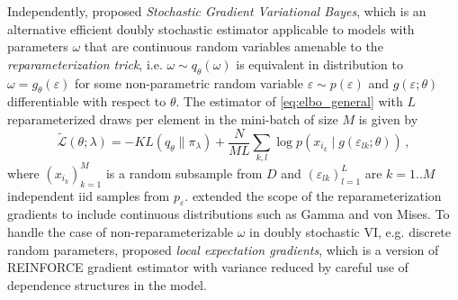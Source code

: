 \documentclass[a4paper,10pt,twocolumn]{article}
\begin{document}
Independently, \citet{kingma_auto-encoding_2014} proposed \emph{Stochastic Gradient
Variational Bayes}, which is an alternative efficient doubly stochastic estimator
applicable to models with parameters $\omega$ that are continuous random variables
amenable to the \emph{reparameterization trick}, i.e. $
  \omega \sim q_{\theta}(\omega)
$ is equivalent in distribution to $
  \omega = g_{\theta}(\varepsilon)
$ for some non-parametric random variable $
  \varepsilon \sim p(\varepsilon)
$ and $
  g(\varepsilon; \theta)
$ differentiable with respect to $\theta$. The estimator of \eqref{eq:elbo_general}
with $L$ reparameterized draws per element in the mini-batch of size $M$ is given by
\begin{equation}  \label{eq:sgvb_estimator}
  \widetilde{\mathcal{L}}(\theta; \lambda)
    = - KL(q_{\theta} \| \pi_{\lambda})
      + \frac{N}{M L} \sum_{k,l}
        \log p(x_{i_k} \mid g(\varepsilon_{lk}; \theta))
    \,,
\end{equation}
where $(x_{i_k})_{k=1}^M$ is a random subsample from $D$ and $
  (\varepsilon_{lk})_{l=1}^L
$ are $k=1..M$ independent iid samples from $p_\varepsilon$. \citet{figurnov_implicit_2019}
extended the scope of the reparameterization gradients to include continuous distributions
such as Gamma and von Mises. To handle the case of non-reparameterizable $\omega$ in
doubly stochastic VI, e.g. discrete random parameters, \citet{titsias_local_2015} proposed
\emph{local expectation gradients}, which is a version of REINFORCE gradient estimator
\citep{williams_simple_1992} with variance reduced by careful use of dependence
structures in the model.
\end{document}

